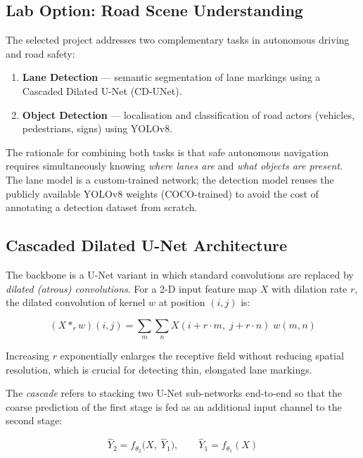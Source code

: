\documentclass[12pt, a4paper]{article}
\begin{document}
\subsection{Lab Option: Road Scene Understanding}

The selected project addresses two complementary tasks in autonomous driving
and road safety:

\begin{enumerate}
  \item \textbf{Lane Detection} — semantic segmentation of lane markings
        using a Cascaded Dilated U-Net (CD-UNet).
  \item \textbf{Object Detection} — localisation and classification of
        road actors (vehicles, pedestrians, signs) using YOLOv8.
\end{enumerate}

The rationale for combining both tasks is that safe autonomous navigation
requires simultaneously knowing \emph{where lanes are} and \emph{what
objects are present}. The lane model is a custom-trained network; the
detection model reuses the publicly available YOLOv8 weights (COCO-trained)
to avoid the cost of annotating a detection dataset from scratch.

\subsection{Cascaded Dilated U-Net Architecture}

The backbone is a U-Net variant in which standard convolutions are replaced
by \emph{dilated (atrous) convolutions}. For a 2-D input feature map $X$
with dilation rate $r$, the dilated convolution of kernel $w$ at position
$(i,j)$ is:

\begin{equation}
  (X \ast_r w)(i,j)
  = \sum_{m}\sum_{n} X(i + r \cdot m,\; j + r \cdot n)\; w(m,n)
  \label{eq:dilated_conv}
\end{equation}

Increasing $r$ exponentially enlarges the receptive field without reducing
spatial resolution, which is crucial for detecting thin, elongated lane
markings.

The \emph{cascade} refers to stacking two U-Net sub-networks end-to-end
so that the coarse prediction of the first stage is fed as an additional
input channel to the second stage:

\begin{equation}
  \hat{Y}_2 = f_{\theta_2}\bigl(X,\; \hat{Y}_1\bigr),
  \qquad
  \hat{Y}_1 = f_{\theta_1}(X)
  \label{eq:cascade}
\end{equation}
\end{document}
